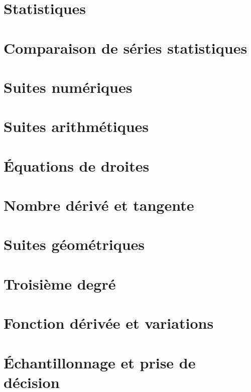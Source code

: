 \documentclass[a4paper,12pt]{book}
\begin{document}
\chapter{Statistiques}


\chapter{Comparaison de séries statistiques}


\chapter{Suites numériques}


\chapter{Suites arithmétiques}


\chapter{Équations de droites}


\chapter{Nombre dérivé et tangente}


\chapter{Suites géométriques}


\chapter{Troisième degré}


\chapter{Fonction dérivée et variations}


\chapter{Échantillonnage et prise de décision}


\end{document}
